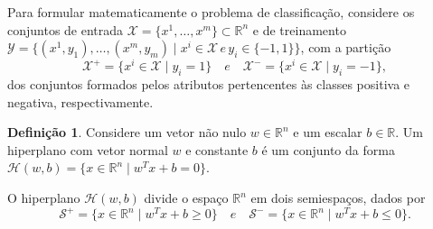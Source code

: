 \documentclass[12pt,a4paper]{scrartcl}
\def\Xset{\mathcal{X}}
\def\Yset{\mathcal{Y}}
\def\Hset{\mathcal{H}}
\def\RR{\mathds{R}}
\theoremstyle{definition}%
\newtheorem{defi}{Definição}
\begin{document}



Para formular matematicamente o problema de classificação, considere os conjuntos de entrada $\Xset =\{x^1, \ldots , x^m \} \subset \RR^n$ e de treinamento $\Yset=\{(x^1, y_1), \ldots , (x^m, y_m)\mid x^i \in \Xset \, e \, y_i \in \{-1,1\}\}$, com a partição 
\[ \label{conj1}
\Xset ^{+} =\{x^i \in \Xset\mid y_i=1\} \quad e \quad \Xset^{-}=\{x^i \in \Xset\mid y_i=-1\},
\]
dos conjuntos formados pelos atributos pertencentes às classes positiva e negativa, respectivamente.

\begin{defi} Considere um vetor não nulo $w\in \RR^n$ e um escalar $b\in \RR$. Um hiperplano com vetor normal $w$ e constante $b$ é um conjunto da forma $\Hset(w,b)=\{x\in \RR^n \mid w^{T}x+b=0\}$.
\end{defi}

O hiperplano $\Hset(w,b)$ divide o espaço $\RR^n$ em dois semiespaços, dados por
\[ \label{conj2}
\mathcal{S}^{+}=\{x\in \RR^n \mid w^{T}x+b\geq 0\} \quad e \quad \mathcal{S}^{-}=\{x\in \RR^n \mid w^{T}x+b\leq 0\}.
\]
\end{document}
